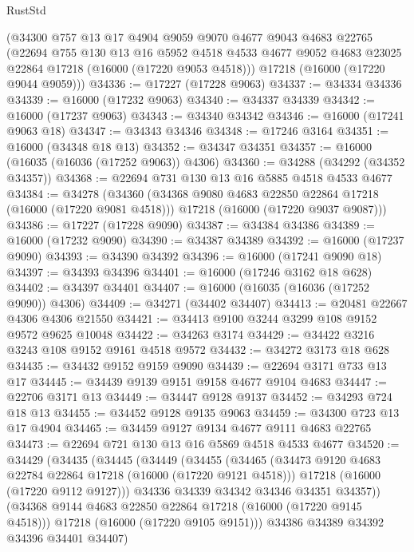\begin{lexlean}{RustStd}
\begin{coremodule}
    (@34300
      @757
      @13
      @17
      @4904
      @9059
      @9070
      @4677
      @9043
      @4683
      @22765
      (@22694
        @755
        @130
        @13
        @16
        @5952
        @4518
        @4533
        @4677
        @9052
        @4683
        @23025
        @22864
        @17218
        (@16000 (@17220 @9053 @4518)))
      @17218
      (@16000 (@17220 @9044 @9059)))
@34336 := @17227 (@17228 @9063)
@34337 := @34334 @34336
@34339 := @16000 (@17232 @9063)
@34340 := @34337 @34339
@34342 := @16000 (@17237 @9063)
@34343 := @34340 @34342
@34346 := @16000 (@17241 @9063 @18)
@34347 := @34343 @34346
@34348 := @17246 @3164
@34351 := @16000 (@34348 @18 @13)
@34352 := @34347 @34351
@34357 := @16000 (@16035 (@16036 (@17252 @9063)) @4306)
@34360 := @34288 (@34292 (@34352 @34357))
@34368 := @22694 @731 @130 @13 @16 @5885 @4518 @4533 @4677
@34384 := @34278
    (@34360
      (@34368 @9080 @4683 @22850 @22864 @17218 (@16000 (@17220 @9081 @4518)))
      @17218
      (@16000 (@17220 @9037 @9087)))
@34386 := @17227 (@17228 @9090)
@34387 := @34384 @34386
@34389 := @16000 (@17232 @9090)
@34390 := @34387 @34389
@34392 := @16000 (@17237 @9090)
@34393 := @34390 @34392
@34396 := @16000 (@17241 @9090 @18)
@34397 := @34393 @34396
@34401 := @16000 (@17246 @3162 @18 @628)
@34402 := @34397 @34401
@34407 := @16000 (@16035 (@16036 (@17252 @9090)) @4306)
@34409 := @34271 (@34402 @34407)
@34413 := @20481 @22667 @4306 @4306 @21550
@34421 := @34413 @9100 @3244 @3299 @108 @9152 @9572 @9625 @10048
@34422 := @34263 @3174
@34429 := @34422 @3216 @3243 @108 @9152 @9161 @4518 @9572
@34432 := @34272 @3173 @18 @628
@34435 := @34432 @9152 @9159 @9090
@34439 := @22694 @3171 @733 @13 @17
@34445 := @34439 @9139 @9151 @9158 @4677 @9104 @4683
@34447 := @22706 @3171 @13
@34449 := @34447 @9128 @9137
@34452 := @34293 @724 @18 @13
@34455 := @34452 @9128 @9135 @9063
@34459 := @34300 @723 @13 @17 @4904
@34465 := @34459 @9127 @9134 @4677 @9111 @4683 @22765
@34473 := @22694 @721 @130 @13 @16 @5869 @4518 @4533 @4677
@34520 := @34429
    (@34435
      (@34445
        (@34449
          (@34455
            (@34465
              (@34473 @9120 @4683 @22784 @22864 @17218 (@16000 (@17220 @9121 @4518)))
              @17218
              (@16000 (@17220 @9112 @9127)))
            @34336
            @34339
            @34342
            @34346
            @34351
            @34357))
        (@34368 @9144 @4683 @22850 @22864 @17218 (@16000 (@17220 @9145 @4518)))
        @17218
        (@16000 (@17220 @9105 @9151)))
      @34386
      @34389
      @34392
      @34396
      @34401
      @34407)

\end{coremodule}
\end{lexlean}

